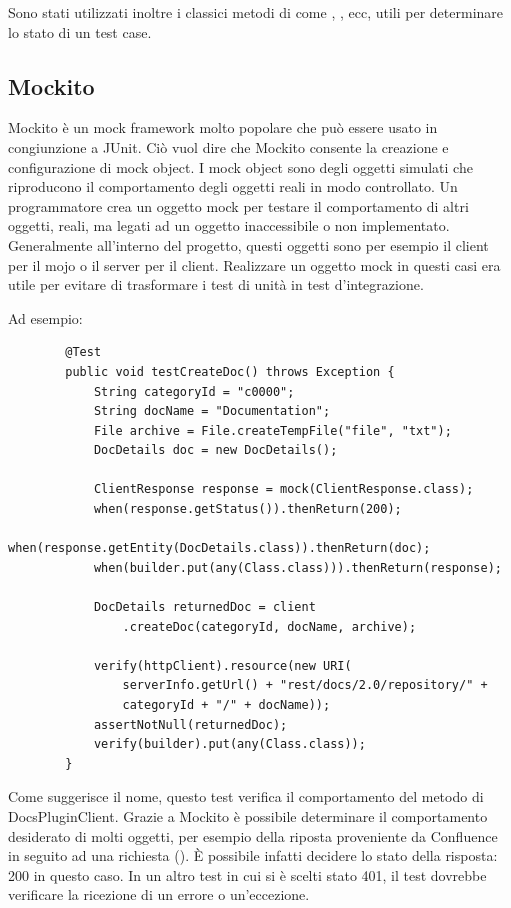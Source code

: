     Sono stati utilizzati inoltre i classici metodi di  come , ,  ecc, utili per determinare lo stato di un test case.

    \subsection{Mockito}
    Mockito è un mock framework molto popolare che può essere usato in congiunzione a JUnit. 
    Ciò vuol dire che Mockito consente la creazione e configurazione di mock object.
    I mock object sono degli oggetti simulati che riproducono il comportamento degli oggetti reali in modo controllato.
    Un programmatore crea un oggetto mock per testare il comportamento di altri oggetti, reali, ma legati ad un oggetto inaccessibile o non implementato.
    Generalmente all'interno del progetto, questi oggetti sono per esempio il client per il mojo o il server per il client.
    Realizzare un oggetto mock in questi casi era utile per evitare di trasformare i test di unità in test d'integrazione.

    Ad esempio:

    \begin{lstlisting} 
        @Test
        public void testCreateDoc() throws Exception {
            String categoryId = "c0000";
            String docName = "Documentation";
            File archive = File.createTempFile("file", "txt");
            DocDetails doc = new DocDetails();

            ClientResponse response = mock(ClientResponse.class);
            when(response.getStatus()).thenReturn(200);
            when(response.getEntity(DocDetails.class)).thenReturn(doc);
            when(builder.put(any(Class.class))).thenReturn(response);

            DocDetails returnedDoc = client
                .createDoc(categoryId, docName, archive);

            verify(httpClient).resource(new URI(
                serverInfo.getUrl() + "rest/docs/2.0/repository/" + 
                categoryId + "/" + docName));
            assertNotNull(returnedDoc);
            verify(builder).put(any(Class.class));
        }
    \end{lstlisting}
    Come suggerisce il nome, questo test verifica il comportamento del metodo  di DocsPluginClient.
    Grazie a Mockito è possibile determinare il comportamento desiderato di molti oggetti, per esempio della riposta proveniente da Confluence in seguito ad una richiesta ().
    È possibile infatti decidere lo stato della risposta: 200 in questo caso.
    In un altro test in cui si è scelti stato 401, il test dovrebbe verificare la ricezione di un errore o un'eccezione.

